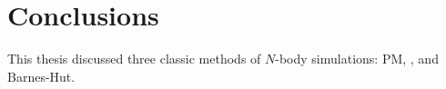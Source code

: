 \chapter{Conclusions}

This thesis discussed three classic methods of $N$-body simulations: PM, \PThreeM{}, and Barnes-Hut.


